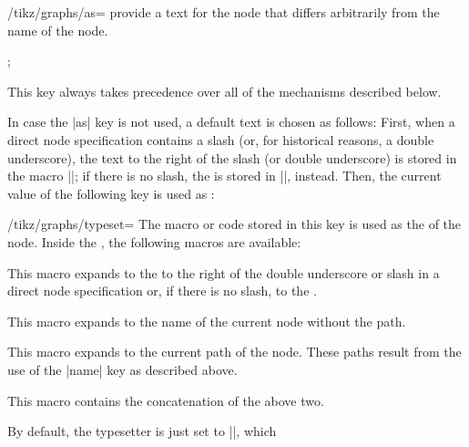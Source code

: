 \begin{itemize}
\begin{key}{/tikz/graphs/as=}
            provide a text for the node that differs arbitrarily from the name
            of the node.
\begin{codeexample}[preamble={\usetikzlibrary{graphs}}]
\tikz {};
\end{codeexample}
            This key always takes precedence over all of the mechanisms
            described below.
        \end{key}
        In case the |as| key is not used, a default text is chosen as follows:
        First, when a direct node specification contains a slash (or, for
        historical reasons, a double underscore), the text to the right of the
        slash (or double underscore) is stored in the macro
        |\tikzgraphnodetext|; if there is no slash, the  is
        stored in |\tikzgraphnodetext|, instead. Then, the current value of the
        following key is used as :
        \begin{key}{/tikz/graphs/typeset=}
            The macro or code stored in this key is used as the  of
            the node. Inside the , the following macros are
            available:
            \begin{command}{\tikzgraphnodetext}
                This macro expands to the  to the right of the
                double underscore or slash in a direct node specification or,
                if there is no slash, to the .
            \end{command}
            \begin{command}{\tikzgraphnodename}
                This macro expands to the name of the current node without the
                path.
            \end{command}
            \begin{command}{\tikzgraphnodepath}
                This macro expands to the current path of the node. These paths
                result from the use of the |name| key as described above.
            \end{command}
            \begin{command}{\tikzgraphnodefullname}
                This macro contains the concatenation of the above two.
            \end{command}
        \end{key}
        By default, the typesetter is just set to |\tikzgraphnodetext|, which

\end{itemize}
